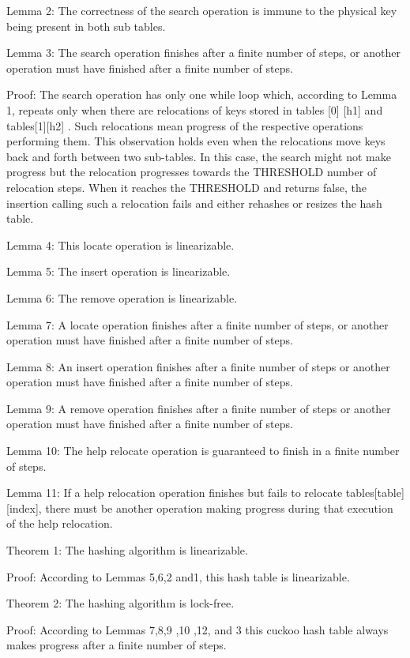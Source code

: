 \documentclass{article}
\begin{document}
Lemma 2: The correctness of the search operation is immune to the physical key being present in both sub tables.

Lemma 3: The search operation finishes after a finite number of steps, or another operation must have finished after a
finite number of steps.

Proof: The search operation has only one while loop which, according to Lemma 1, repeats only when there are relocations
of keys stored in tables [0] [h1] and tables[1][h2] . Such relocations mean progress of the respective operations
performing them. This observation holds even when the relocations move keys back and forth between two sub-tables. In
this case, the search might not make progress but the relocation progresses towards the THRESHOLD number of relocation
steps. When it reaches the THRESHOLD and returns false, the insertion calling such a relocation fails and either
rehashes or resizes the hash table.

Lemma 4: This locate operation is linearizable.

Lemma 5: The insert operation is linearizable.

Lemma 6: The remove operation is linearizable.

Lemma 7: A locate operation finishes after a finite number of steps, or another operation must have finished after a
finite number of steps.

Lemma 8: An insert operation finishes after a finite number of steps or another operation must have finished after a
finite number of steps.

Lemma 9: A remove operation finishes after a finite number of steps or another operation must have finished after a
finite number of steps.

Lemma 10: The help relocate operation is guaranteed to finish in a finite number of steps.

Lemma 11: If a help relocation operation finishes but fails to relocate tables[table][index], there must be another
operation making progress during that execution of the help relocation.

Theorem 1: The hashing algorithm is linearizable.

Proof: According to Lemmas 5,6,2 and1, this hash table is linearizable. 

Theorem 2: The hashing algorithm is lock-free.

Proof: According to Lemmas 7,8,9 ,10 ,12, and 3 this cuckoo hash table always makes progress after a finite number of
steps.
\end{document}
